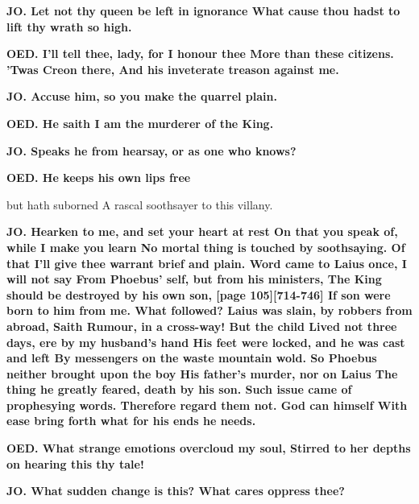 \documentclass[11pt,letter]{book}
\begin{document}
\par \textbf{JO. Let not thy queen be left in ignorance What cause thou hadst to lift thy wrath so high.}
\par 

\par \textbf{OED. I’ll tell thee, lady, for I honour thee More than these citizens. ’Twas Creon there, And his inveterate treason against me.}
\par 

\par \textbf{JO. Accuse him, so you make the quarrel plain.}
\par 

\par \textbf{OED. He saith I am the murderer of the King.}
\par 

\par \textbf{JO. Speaks he from hearsay, or as one who knows?}
\par 

\par \textbf{OED. He keeps his own lips free}
\par   but hath suborned A rascal soothsayer to this villany.

\par \textbf{JO. Hearken to me, and set your heart at rest On that you speak of, while I make you learn No mortal thing is touched by soothsaying. Of that I’ll give thee warrant brief and plain. Word came to Laius once, I will not say From Phoebus’ self, but from his ministers, The King should be destroyed by his own son, [page 105][714-746] If son were born to him from me. What followed? Laius was slain, by robbers from abroad, Saith Rumour, in a cross-way! But the child Lived not three days, ere by my husband’s hand His feet were locked, and he was cast and left By messengers on the waste mountain wold. So Phoebus neither brought upon the boy His father’s murder, nor on Laius The thing he greatly feared, death by his son. Such issue came of prophesying words. Therefore regard them not. God can himself With ease bring forth what for his ends he needs.}
\par 

\par \textbf{OED. What strange emotions overcloud my soul, Stirred to her depths on hearing this thy tale!}
\par 

\par \textbf{JO. What sudden change is this? What cares oppress thee?}
\par 
\end{document}
